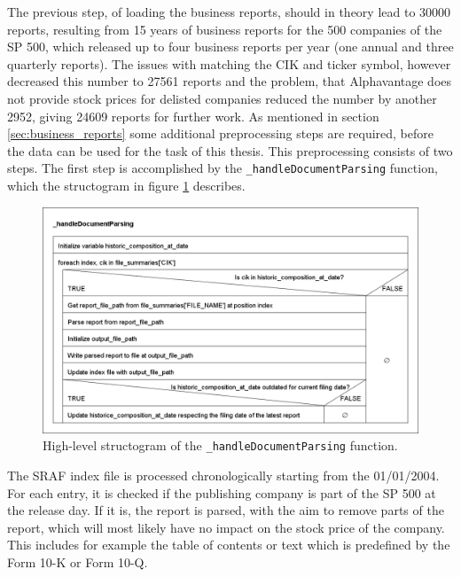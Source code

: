 The previous step, of loading the business reports, should in theory lead to 30000 reports, resulting from 15 years of business reports for the 500 companies of the \ac{SP} 500, which released up to four business reports per year (one annual and three quarterly reports).
The issues with matching the \ac{CIK} and ticker symbol, however decreased this number to 27561 reports and the problem, that Alphavantage does not provide stock prices for delisted companies reduced the number by another 2952, giving 24609 reports for further work.
As mentioned in section \ref{sec:business_reports} some additional preprocessing steps are required, before the data can be used for the task of this thesis.
This preprocessing consists of two steps.
The first step is accomplished by the \texttt{\_handleDocumentParsing} function, which the structogram in figure \ref{figure:structogram_handleDocumentParsing} describes.
\begin{figure}[h]
    \centering
    \includegraphics[width=1\textwidth]{figures/structogram_handleDocumentParsing.png}
    \caption{High-level structogram of the \texttt{\_handleDocumentParsing} function.}
    \label{figure:structogram_handleDocumentParsing}
\end{figure}
The \ac{SRAF} index file is processed chronologically starting from the 01/01/2004.
For each entry, it is checked if the publishing company is part of the \ac{SP} 500 at the release day.
If it is, the report is parsed, with the aim to remove parts of the report, which will most likely have no impact on the stock price of the company.
This includes for example the table of contents or text which is predefined by the Form 10-K or Form 10-Q.
